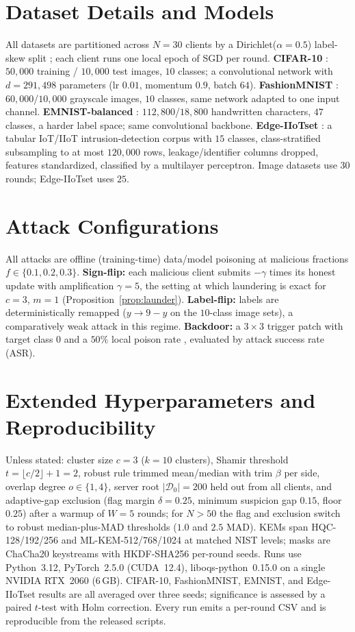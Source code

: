 \documentclass[lettersize,journal]{IEEEtran}
\begin{document}
\appendices
\section{Dataset Details and Models}\label{app:data}
All datasets are partitioned across $N{=}30$ clients by a Dirichlet($\alpha{=}0.5$)
label-skew split \cite{hsu2019}; each client runs one local epoch of SGD
per round. \textbf{CIFAR-10} \cite{krizhevsky2009}: $50{,}000$ training / $10{,}000$ test
images, $10$ classes; a convolutional network with $d{=}291{,}498$ parameters (lr
$0.01$, momentum $0.9$, batch $64$). \textbf{FashionMNIST} \cite{fashionmnist}: $60{,}000$/$10{,}000$
grayscale images, $10$ classes, same network adapted to one input channel.
\textbf{EMNIST-balanced} \cite{emnist}: $112{,}800$/$18{,}800$ handwritten characters, $47$ classes,
a harder label space; same convolutional backbone. \textbf{Edge-IIoTset}
\cite{edgeiiot}: a tabular IoT/IIoT intrusion-detection corpus with $15$ classes,
class-stratified subsampling to at most $120{,}000$ rows, leakage/identifier columns
dropped, features standardized, classified by a multilayer perceptron. Image
datasets use $30$ rounds; Edge-IIoTset uses $25$.

\section{Attack Configurations}\label{app:attacks}
All attacks are offline (training-time) data/model poisoning at malicious fractions
$f\in\{0.1,0.2,0.3\}$. \textbf{Sign-flip:} each malicious client submits
$-\gamma$ times its honest update with amplification $\gamma{=}5$, the setting at
which laundering is exact for $c{=}3$, $m{=}1$ (Proposition~\ref{prop:launder}).
\textbf{Label-flip:} labels are deterministically remapped ($y\!\to\!9{-}y$ on the
$10$-class image sets), a comparatively weak attack in this regime.
\textbf{Backdoor:} a $3{\times}3$ trigger patch with target class $0$ and a $50\%$
local poison rate \cite{bagdasaryan2020}, evaluated by attack success rate (ASR).

\section{Extended Hyperparameters and Reproducibility}\label{app:repro}
Unless stated: cluster size $c{=}3$ ($k{=}10$ clusters), Shamir threshold
$t{=}\lfloor c/2\rfloor{+}1{=}2$, robust rule trimmed mean/median with trim
$\beta$ per side, overlap degree $o\in\{1,4\}$, server root $|\mathcal{D}_0|{=}200$
held out from all clients, and adaptive-gap exclusion (flag margin $\delta{=}0.25$,
minimum suspicion gap $0.15$, floor $0.25$) after a warmup of $W{=}5$ rounds; for
$N{>}50$ the flag and exclusion switch to robust median-plus-MAD thresholds
($1.0$ and $2.5$ MAD). KEMs span HQC-128/192/256 and
ML-KEM-512/768/1024 at matched NIST levels; masks are ChaCha20 keystreams with
HKDF-SHA256 per-round seeds. Runs use Python~3.12, PyTorch~2.5.0 (CUDA~12.4),
liboqs-python~0.15.0 on a single NVIDIA RTX~2060 (6\,GB). CIFAR-10, FashionMNIST,
EMNIST, and Edge-IIoTset results are all averaged over three seeds;
significance is assessed by a paired $t$-test with Holm correction. Every run emits
a per-round CSV and is reproducible from the released scripts.
\end{document}
